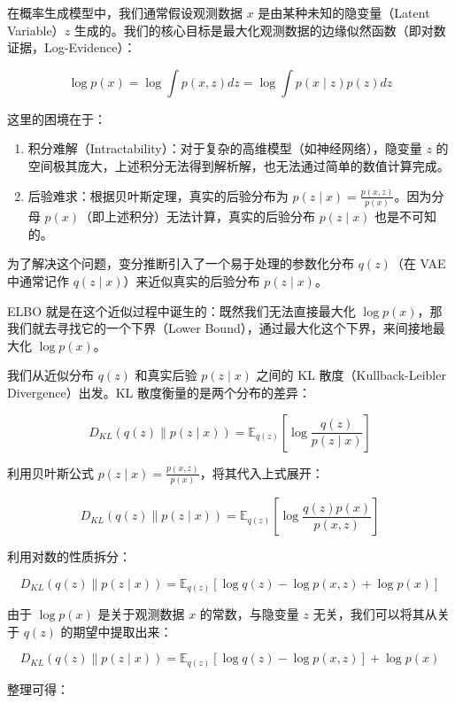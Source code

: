 在概率生成模型中，我们通常假设观测数据 \(x\) 是由某种未知的隐变量（Latent Variable）\(z\) 生成的。我们的核心目标是最大化观测数据的边缘似然函数（即对数证据，Log-Evidence）：

\[
\log p(x)=\log\int p(x,z)dz=\log\int p(x\mid z)p(z)dz
\]

这里的困境在于：

\begin{enumerate}
\def\labelenumi{\arabic{enumi}.}
\tightlist
\item
  积分难解（Intractability）：对于复杂的高维模型（如神经网络），隐变量 \(z\) 的空间极其庞大，上述积分无法得到解析解，也无法通过简单的数值计算完成。
\item
  后验难求：根据贝叶斯定理，真实的后验分布为 \(p(z\mid x)=\frac{p(x,z)}{p(x)}\)。因为分母 \(p(x)\)（即上述积分）无法计算，真实的后验分布 \(p(z\mid x)\) 也是不可知的。
\end{enumerate}

为了解决这个问题，变分推断引入了一个易于处理的参数化分布 \(q(z)\)（在 VAE 中通常记作 \(q(z\mid x)\)）来近似真实的后验分布 \(p(z\mid x)\)。

ELBO 就是在这个近似过程中诞生的：既然我们无法直接最大化 \(\log p(x)\)，那我们就去寻找它的一个下界（Lower Bound），通过最大化这个下界，来间接地最大化 \(\log p(x)\)。

我们从近似分布 \(q(z)\) 和真实后验 \(p(z\mid x)\) 之间的 KL 散度（Kullback-Leibler Divergence）出发。KL 散度衡量的是两个分布的差异：

\[
D_{KL}(q(z)\parallel p(z\mid x))=\mathbb{E}_{q(z)}\left[\log\frac{q(z)}{p(z\mid x)}\right]
\]

利用贝叶斯公式 \(p(z\mid x)=\frac{p(x,z)}{p(x)}\)，将其代入上式展开：

\[
D_{KL}(q(z)\parallel p(z\mid x))=\mathbb{E}_{q(z)}\left[\log\frac{q(z)p(x)}{p(x,z)}\right]
\]

利用对数的性质拆分：

\[
D_{KL}(q(z)\parallel p(z\mid x))=\mathbb{E}_{q(z)}[\log q(z)-\log p(x,z)+\log p(x)]
\]

由于 \(\log p(x)\) 是关于观测数据 \(x\) 的常数，与隐变量 \(z\) 无关，我们可以将其从关于 \(q(z)\) 的期望中提取出来：

\[
D_{KL}(q(z)\parallel p(z\mid x))=\mathbb{E}_{q(z)}[\log q(z)-\log p(x,z)]+\log p(x)
\]

整理可得：

